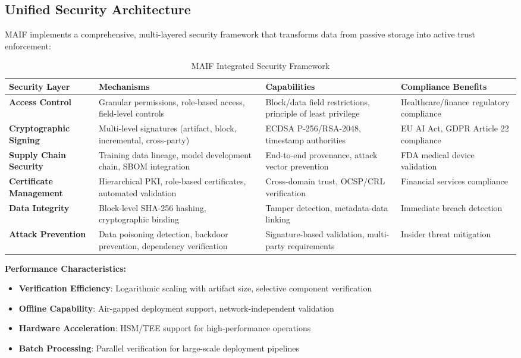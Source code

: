 \documentclass[conference]{IEEEtran}
\begin{document}
\subsection{Unified Security Architecture}

MAIF implements a comprehensive, multi-layered security framework that transforms data from passive storage into active trust enforcement:

\begin{table*}[!t]
\renewcommand{\arraystretch}{1.3}
\caption{MAIF Integrated Security Framework}
\label{tab:integrated-security}
\centering
\footnotesize
\begin{tabular}{p{3cm}p{4.5cm}p{4cm}p{4.5cm}}
\toprule
\textbf{Security Layer} & \textbf{Mechanisms} & \textbf{Capabilities} & \textbf{Compliance Benefits} \\
\midrule
\textbf{Access Control} & Granular permissions, role-based access, field-level controls & Block/data field restrictions, principle of least privilege & Healthcare/finance regulatory compliance \\
\textbf{Cryptographic Signing} & Multi-level signatures (artifact, block, incremental, cross-party) & ECDSA P-256/RSA-2048, timestamp authorities & EU AI Act, GDPR Article 22 compliance \\
\textbf{Supply Chain Security} & Training data lineage, model development chain, SBOM integration & End-to-end provenance, attack vector prevention & FDA medical device validation \\
\textbf{Certificate Management} & Hierarchical PKI, role-based certificates, automated validation & Cross-domain trust, OCSP/CRL verification & Financial services compliance \\
\textbf{Data Integrity} & Block-level SHA-256 hashing, cryptographic binding & Tamper detection, metadata-data linking & Immediate breach detection \\
\textbf{Attack Prevention} & Data poisoning detection, backdoor prevention, dependency verification & Signature-based validation, multi-party requirements & Insider threat mitigation \\
\bottomrule
\end{tabular}
\end{table*}

\textbf{Performance Characteristics:}
\begin{itemize}[leftmargin=*]
\item \textbf{Verification Efficiency}: Logarithmic scaling with artifact size, selective component verification
\item \textbf{Offline Capability}: Air-gapped deployment support, network-independent validation
\item \textbf{Hardware Acceleration}: HSM/TEE support for high-performance operations
\item \textbf{Batch Processing}: Parallel verification for large-scale deployment pipelines
\end{itemize}
\end{document}
